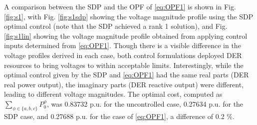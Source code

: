 A comparison between the SDP and the OPF of \eqref{eq:OPF1} is shown in Fig. \ref{fig:s1}, with Fig. \ref{fig:s1sdp} showing the voltage magnitude profile using the SDP optimal control (note that the SDP achieved a rank 1 solution), and Fig. \ref{fig:s1lin} showing the voltage magnitude profile obtained from applying control inputs determined from \eqref{eq:OPF1}.  Though there is a visible difference in the voltage profiles derived in each case, both control formulations deployed DER resources to bring voltages to within acceptable limits.  Interestingly, while the optimal control given by the SDP and \eqref{eq:OPF1} had the same real parts (DER real power output), the imaginary parts (DER reactive output) were different, leading to different voltage magnitudes. The optimal cost, computed as $\sum_{\phi \in \{ a,b,c\}} P_{0}^{\phi}$, was 0.83732 p.u. for the uncontrolled case, 0.27634 p.u. for the SDP case, and 0.27688 p.u. for the case of \eqref{eq:OPF1}, a difference of 0.2 \%.


